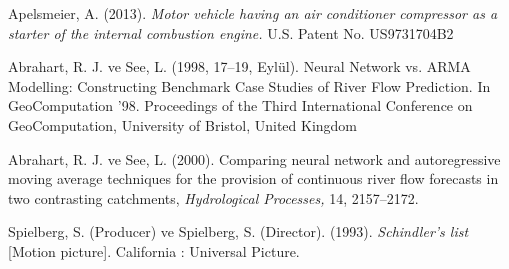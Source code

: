 {\par}

{\teksatir Apelsmeier, A. (2013).\textit{ Motor vehicle having an air conditioner compressor as a starter of the internal combustion engine. }U.S. Patent No. US9731704B2\textit{ }\par}

\begin{kaynaklistesi}
  \item Abrahart, R. J. ve See, L. (1998, 17–19, Eylül). Neural Network vs. ARMA Modelling: Constructing Benchmark Case Studies of River Flow Prediction. In GeoComputation ’98. Proceedings of the Third International Conference on GeoComputation, University of Bristol, United Kingdom

  \item Abrahart, R. J. ve See, L. (2000). Comparing neural network and autoregressive moving average techniques for the provision of continuous river flow forecasts in two contrasting catchments, \textit{Hydrological Processes,} 14, 2157–2172.

  \item Spielberg, S. (Producer) ve Spielberg, S. (Director). (1993). \textit{Schindler’s list }[Motion picture]. California : Universal Picture.

\end{kaynaklistesi}


